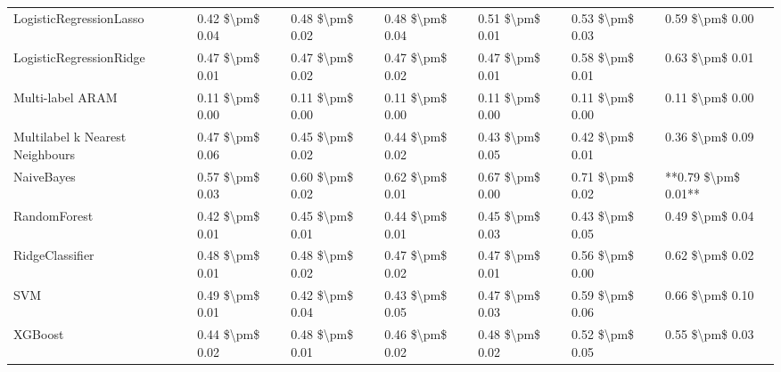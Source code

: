\begin{tabular}{lllllll}
        LogisticRegressionLasso & 0.42 \$\textbackslash pm\$ 0.04 &           0.48 \$\textbackslash pm\$ 0.02 &       0.48 \$\textbackslash pm\$ 0.04 &        0.51 \$\textbackslash pm\$ 0.01 &                         0.53 \$\textbackslash pm\$ 0.03 &     0.59 \$\textbackslash pm\$ 0.00 \\
        LogisticRegressionRidge & 0.47 \$\textbackslash pm\$ 0.01 &           0.47 \$\textbackslash pm\$ 0.02 &       0.47 \$\textbackslash pm\$ 0.02 &        0.47 \$\textbackslash pm\$ 0.01 &                         0.58 \$\textbackslash pm\$ 0.01 &     0.63 \$\textbackslash pm\$ 0.01 \\
               Multi-label ARAM & 0.11 \$\textbackslash pm\$ 0.00 &           0.11 \$\textbackslash pm\$ 0.00 &       0.11 \$\textbackslash pm\$ 0.00 &        0.11 \$\textbackslash pm\$ 0.00 &                         0.11 \$\textbackslash pm\$ 0.00 &     0.11 \$\textbackslash pm\$ 0.00 \\
Multilabel k Nearest Neighbours & 0.47 \$\textbackslash pm\$ 0.06 &           0.45 \$\textbackslash pm\$ 0.02 &       0.44 \$\textbackslash pm\$ 0.02 &        0.43 \$\textbackslash pm\$ 0.05 &                         0.42 \$\textbackslash pm\$ 0.01 &     0.36 \$\textbackslash pm\$ 0.09 \\
                     NaiveBayes & 0.57 \$\textbackslash pm\$ 0.03 &           0.60 \$\textbackslash pm\$ 0.02 &       0.62 \$\textbackslash pm\$ 0.01 &        0.67 \$\textbackslash pm\$ 0.00 &                         0.71 \$\textbackslash pm\$ 0.02 & **0.79 \$\textbackslash pm\$ 0.01** \\
                   RandomForest & 0.42 \$\textbackslash pm\$ 0.01 &           0.45 \$\textbackslash pm\$ 0.01 &       0.44 \$\textbackslash pm\$ 0.01 &        0.45 \$\textbackslash pm\$ 0.03 &                         0.43 \$\textbackslash pm\$ 0.05 &     0.49 \$\textbackslash pm\$ 0.04 \\
                RidgeClassifier & 0.48 \$\textbackslash pm\$ 0.01 &           0.48 \$\textbackslash pm\$ 0.02 &       0.47 \$\textbackslash pm\$ 0.02 &        0.47 \$\textbackslash pm\$ 0.01 &                         0.56 \$\textbackslash pm\$ 0.00 &     0.62 \$\textbackslash pm\$ 0.02 \\
                            SVM & 0.49 \$\textbackslash pm\$ 0.01 &           0.42 \$\textbackslash pm\$ 0.04 &       0.43 \$\textbackslash pm\$ 0.05 &        0.47 \$\textbackslash pm\$ 0.03 &                         0.59 \$\textbackslash pm\$ 0.06 &     0.66 \$\textbackslash pm\$ 0.10 \\
                        XGBoost & 0.44 \$\textbackslash pm\$ 0.02 &           0.48 \$\textbackslash pm\$ 0.01 &       0.46 \$\textbackslash pm\$ 0.02 &        0.48 \$\textbackslash pm\$ 0.02 &                         0.52 \$\textbackslash pm\$ 0.05 &     0.55 \$\textbackslash pm\$ 0.03 \\
\bottomrule
\end{tabular}
